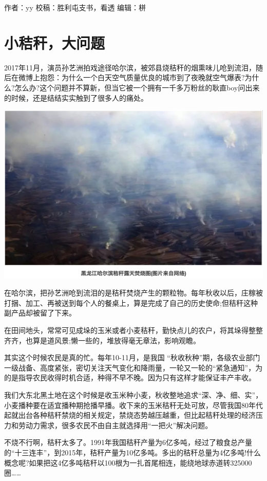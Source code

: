 \documentclass[]{book}
\begin{document}
作者：yy
校稿：胜利屯支书，看透
编辑：栟

\hypertarget{ux5c0fux79f8ux79c6ux5927ux95eeux9898}{%
\section{小秸秆，大问题}\label{ux5c0fux79f8ux79c6ux5927ux95eeux9898}}

2017年11月，演员孙艺洲拍戏途径哈尔滨，被郊县烧秸秆的烟熏味儿呛到流泪，随后在微博上抱怨：为什么一个白天空气质量优良的城市到了夜晚就空气爆表?为什么?怎么办?这个问题并不算新，但当它被一个拥有一千多万粉丝的耿直boy问出来的时候，还是结结实实触到了很多人的痛处。

\includegraphics[width=8.33in]{images/stalk1}

在哈尔滨，把孙艺洲呛到流泪的是秸秆焚烧产生的颗粒物。每年秋收以后，庄稼被打捆、加工、再被送到每个人的餐桌上，算是完成了自己的历史使命;但秸秆这种副产品却被留了下来。

在田间地头，常常可见成垛的玉米或者小麦秸秆，勤快点儿的农户，将其垛得整整齐齐，也算是道风景;懒一些的，堆放得毫无章法，影响观瞻。

其实这个时候农民是真的忙。每年10-11月，是我国 ``秋收秋种''期，各级农业部门一级战备、高度紧张，密切关注天气变化和降雨量，一轮又一轮的``紧急通知''，为的是指导农民收得时机合适，种得不早不晚。因为只有这样才能保证丰产丰收。

我们大东北黑土地在这个时候是收玉米种小麦，秋收整地追求``深、净、细、实''，小麦播种要在适宜播种期抢播早播。收下来的玉米秸秆无处可放，尽管我国80年代起就出台各种秸秆禁烧的相关规定，禁烧态势越压越重，但比起秸秆处理的经济压力和劳动力需求，很多农民不由自主就选择用``一把火''解决问题。

不烧不行啊，秸秆太多了。1991年我国秸秆产量为6亿多吨，经过了粮食总产量的``十三连丰''，到2015年，秸秆产量为10亿多吨。多出的秸秆总量为4亿多吨!什么概念呢?如果把这4亿多吨秸秆以100根为一扎首尾相连，能绕地球赤道转325000圈\ldots{}\ldots{}
\end{document}
